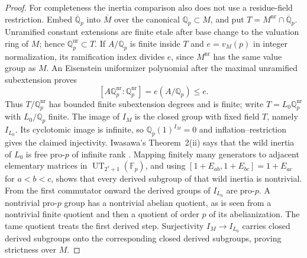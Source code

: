 \begin{proof}
For completeness the inertia comparison also does not
use a residue-field restriction.
Embed $\overline{\mathbb Q}_p$ into $\overline M$ over
the canonical $\mathbb Q_p\subset M$, and put
$T=M^{\mathrm{nr}}\cap\overline{\mathbb Q}_p$.
Unramified constant extensions are finite etale after
base change to the valuation ring of $M$; hence
$\mathbb Q_p^{\mathrm{nr}}\subset T$.
If $A/\mathbb Q_p$ is finite inside $T$ and
$e=v_M(p)$ in integer normalization, its ramification
index divides $e$, since $M^{\mathrm{nr}}$ has the same
value group as $M$.
An Eisenstein uniformizer polynomial after the maximal
unramified subextension proves
\[
 [A\mathbb Q_p^{\mathrm{nr}}:\mathbb Q_p^{\mathrm{nr}}]
                                      =e(A/\mathbb Q_p)\le e.
\]
Thus $T/\mathbb Q_p^{\mathrm{nr}}$ has bounded finite
subextension degrees and is finite; write
$T=L_0\mathbb Q_p^{\mathrm{nr}}$ with $L_0/\mathbb Q_p$ finite.
The image of $I_M$ is the closed group with fixed field
$T$, namely $I_{L_0}$.
Its cyclotomic image is infinite, so
$\mathbb Q_p(1)^{I_M}=0$ and inflation--restriction
gives the claimed injectivity.
Iwasawa's Theorem~2(ii) says that the wild inertia of
$L_0$ is free pro-$p$ of infinite rank
\citep{AN_Iwasawa1955}.
Mapping finitely many generators to adjacent elementary
matrices in $\operatorname{UT}_{2^s+1}(\mathbb F_p)$,
and using
$[1+E_{ab},1+E_{bc}]=1+E_{ac}$ for $a<b<c$,
shows that every derived subgroup of that wild inertia
is nontrivial.
From the first commutator onward the derived groups
of $I_{L_0}$ are pro-$p$.  A nontrivial pro-$p$ group
has a nontrivial abelian quotient, as is seen from a
nontrivial finite quotient and then a quotient of order
$p$ of its abelianization.
The tame quotient treats the first derived step.
Surjectivity $I_M\to I_{L_0}$ carries closed derived
subgroups onto the corresponding closed derived
subgroups, proving strictness over $M$.


\end{proof}
